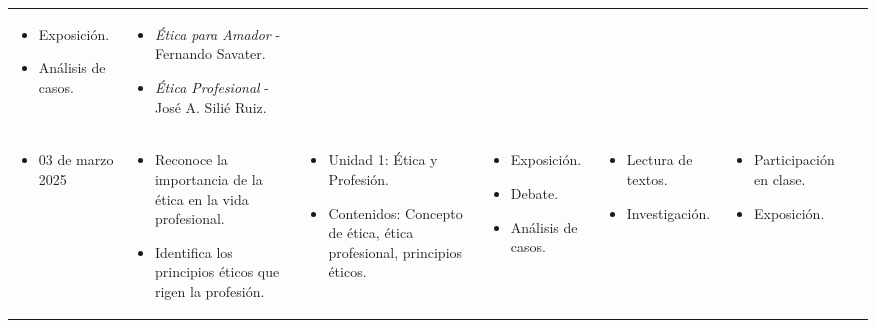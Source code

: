 \begin{landscape}
\begin{xltabular}{\linewidth}{@{}X@{}X@{}X@{}X@{}X@{}X@{}X@{}}
\begin{itemize}
            \item Exposición.
            \item Análisis de casos.
        \end{itemize}                             &
        \begin{itemize}
            \item \textit{Ética para Amador} - Fernando Savater.
            \item \textit{Ética Profesional} - José A. Silié Ruiz.
        \end{itemize}\\
        \begin{itemize}[label={}, left=0pt .. 0pt]
            \item 03 de marzo 2025
        \end{itemize}                                                          &
        \begin{itemize}
            \item Reconoce la importancia de la ética en la vida profesional.
            \item Identifica los principios éticos que rigen la profesión.
        \end{itemize}          &
        \begin{itemize}
            \item Unidad 1: Ética y Profesión.
            \item Contenidos: Concepto de ética, ética profesional, principios éticos.
        \end{itemize} &
        \begin{itemize}
            \item Exposición.
            \item Debate.
            \item Análisis de casos.
        \end{itemize}                             &
        \begin{itemize}
            \item Lectura de textos.
            \item Investigación.
        \end{itemize}                             &
        \begin{itemize}
            \item Participación en clase.
            \item Exposición.

\end{itemize}
\end{xltabular}
\end{landscape}
